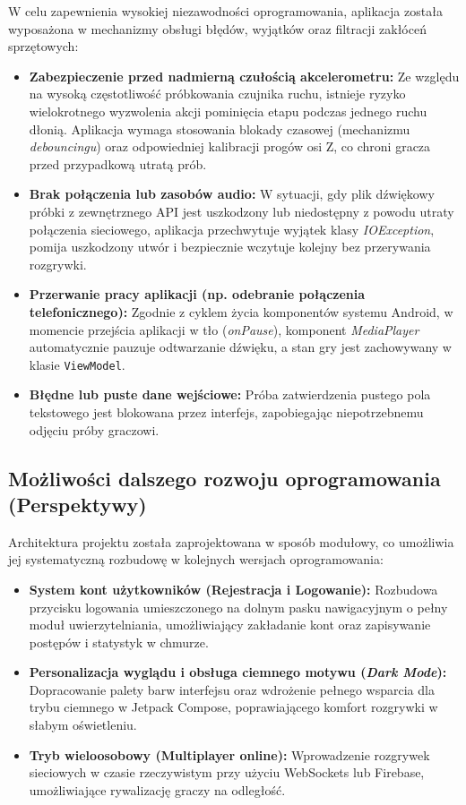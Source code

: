 \hspace{0.60cm}W celu zapewnienia wysokiej niezawodności oprogramowania, aplikacja została wyposażona w mechanizmy obsługi błędów, wyjątków oraz filtracji zakłóceń sprzętowych:

\begin{itemize}
    \item \textbf{Zabezpieczenie przed nadmierną czułością akcelerometru:} Ze względu na wysoką częstotliwość próbkowania czujnika ruchu, istnieje ryzyko wielokrotnego wyzwolenia akcji pominięcia etapu podczas jednego ruchu dłonią. Aplikacja wymaga stosowania blokady czasowej (mechanizmu \textit{debouncingu}) oraz odpowiedniej kalibracji progów osi Z, co chroni gracza przed przypadkową utratą prób.
    \item \textbf{Brak połączenia lub zasobów audio:} W sytuacji, gdy plik dźwiękowy próbki z zewnętrznego API jest uszkodzony lub niedostępny z powodu utraty połączenia sieciowego, aplikacja przechwytuje wyjątek klasy \textit{IOException}, pomija uszkodzony utwór i bezpiecznie wczytuje kolejny bez przerywania rozgrywki.
    \item \textbf{Przerwanie pracy aplikacji (np. odebranie połączenia telefonicznego):} Zgodnie z cyklem życia komponentów systemu Android, w momencie przejścia aplikacji w tło (\textit{onPause}), komponent \textit{MediaPlayer} automatycznie pauzuje odtwarzanie dźwięku, a stan gry jest zachowywany w klasie \texttt{ViewModel}.
    \item \textbf{Błędne lub puste dane wejściowe:} Próba zatwierdzenia pustego pola tekstowego jest blokowana przez interfejs, zapobiegając niepotrzebnemu odjęciu próby graczowi.
\end{itemize}

\subsection{Możliwości dalszego rozwoju oprogramowania (Perspektywy)}

\hspace{0.60cm}Architektura projektu została zaprojektowana w sposób modułowy, co umożliwia jej systematyczną rozbudowę w kolejnych wersjach oprogramowania:

\begin{itemize}
    \item \textbf{System kont użytkowników (Rejestracja i Logowanie):} Rozbudowa przycisku logowania umieszczonego na dolnym pasku nawigacyjnym o pełny moduł uwierzytelniania, umożliwiający zakładanie kont oraz zapisywanie postępów i statystyk w chmurze.
    \item \textbf{Personalizacja wyglądu i obsługa ciemnego motywu (\textit{Dark Mode}):} Dopracowanie palety barw interfejsu oraz wdrożenie pełnego wsparcia dla trybu ciemnego w Jetpack Compose, poprawiającego komfort rozgrywki w słabym oświetleniu.
    \item \textbf{Tryb wieloosobowy (Multiplayer online):} Wprowadzenie rozgrywek sieciowych w czasie rzeczywistym przy użyciu WebSockets lub Firebase, umożliwiające rywalizację graczy na odległość.
\end{itemize}